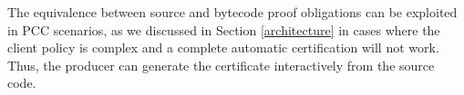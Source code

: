 

 The equivalence between source and bytecode proof obligations can be exploited in PCC scenarios, as we discussed in Section \ref{architecture}  in cases where the client policy is complex and a complete automatic certification will not work. Thus, the producer can generate the certificate interactively from the source code. 







